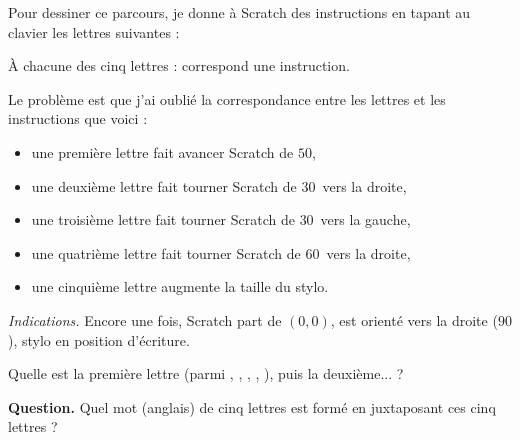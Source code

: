 \documentclass[class=report,crop=false, 12pt]{standalone}
\begin{document}
\begin{enigme}
Pour dessiner ce parcours, je donne à Scratch des instructions en tapant au clavier 
les lettres suivantes :

\centerline{}


À chacune des cinq lettres :  correspond une instruction.

Le problème est que j'ai oublié la correspondance entre les lettres et les instructions que voici :
\begin{itemize}
  \item une première lettre fait avancer Scratch de $50$,
  \item une deuxième lettre fait tourner Scratch de $30$\textdegree\ vers la droite,  
  \item une troisième lettre fait tourner Scratch de $30$\textdegree\ vers la gauche,  
  \item une quatrième lettre fait tourner Scratch de $60$\textdegree\ vers la droite,   
  \item une cinquième lettre augmente la taille du stylo.  
\end{itemize}

\bigskip

\emph{Indications.}
Encore une fois, Scratch part de $(0,0)$, est orienté vers la droite ($90$\textdegree), stylo en position d'écriture.


Quelle est la première lettre (parmi , , , , ),
puis la deuxième... ? %

\textbf{Question.} Quel mot (anglais) de cinq lettres est formé en juxtaposant ces cinq lettres ?




\end{enigme}
\end{document}
